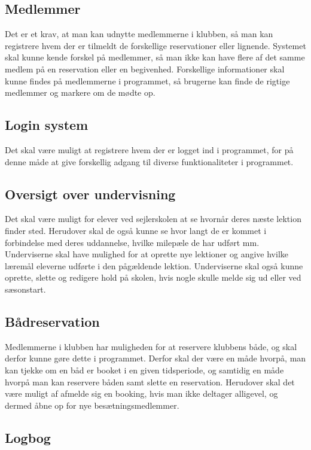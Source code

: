 \subsection{Medlemmer}

Det er et krav, at man kan udnytte medlemmerne i klubben, så man kan registrere hvem der er tilmeldt de forskellige reservationer eller lignende. 
Systemet skal kunne kende forskel på medlemmer, så man ikke kan have flere af det samme medlem på en reservation eller en begivenhed.
Forskellige informationer skal kunne findes på medlemmerne i programmet, så brugerne kan finde de rigtige medlemmer og markere om de mødte op.

\subsection{Login system}
Det skal være muligt at registrere hvem der er logget ind i programmet, for på denne måde at give forskellig adgang til diverse funktionaliteter i programmet.

\subsection{Oversigt over undervisning}

Det skal være muligt for elever ved sejlerskolen at se hvornår deres næste lektion finder sted.
Herudover skal de også kunne se hvor langt de er kommet i forbindelse med deres uddannelse, hvilke milepæle de har udført mm.
Underviserne skal have mulighed for at oprette nye lektioner og angive hvilke læremål eleverne udførte i den pågældende lektion. 
Underviserne skal også kunne oprette, slette og redigere hold på skolen, hvis nogle skulle melde sig ud eller ved sæsonstart.

\subsection{Bådreservation}

Medlemmerne i klubben har muligheden for at reservere klubbens både, og skal derfor kunne gøre dette i programmet.
Derfor skal der være en måde hvorpå, man kan tjekke om en båd er booket i en given tidsperiode, og samtidig en måde hvorpå man kan reservere båden samt slette en reservation.
Herudover skal det være muligt af afmelde sig en booking, hvis man ikke deltager alligevel, og dermed åbne op for nye besætningsmedlemmer.


\subsection{Logbog}

